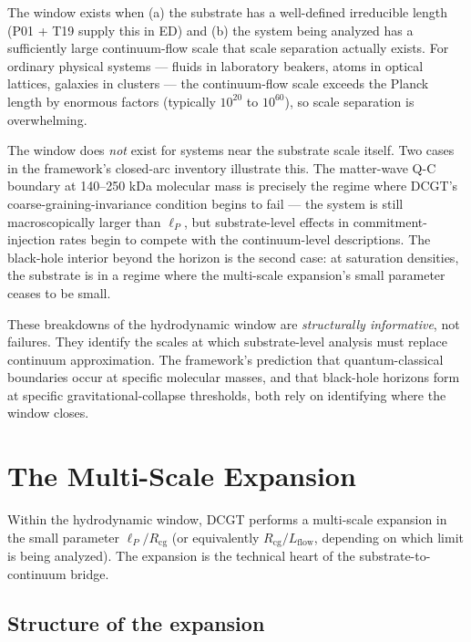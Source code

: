 \documentclass[11pt,a4paper]{article}
\begin{document}
The window exists when (a) the substrate has a well-defined irreducible length (P01 + T19 supply this in ED) and (b) the system being analyzed has a sufficiently large continuum-flow scale that scale separation actually exists. For ordinary physical systems --- fluids in laboratory beakers, atoms in optical lattices, galaxies in clusters --- the continuum-flow scale exceeds the Planck length by enormous factors (typically $10^{20}$ to $10^{60}$), so scale separation is overwhelming.

The window does \emph{not} exist for systems near the substrate scale itself. Two cases in the framework's closed-arc inventory illustrate this. The matter-wave Q-C boundary at 140--250 kDa molecular mass is precisely the regime where DCGT's coarse-graining-invariance condition begins to fail --- the system is still macroscopically larger than $\ell_P$, but substrate-level effects in commitment-injection rates begin to compete with the continuum-level descriptions. The black-hole interior beyond the horizon is the second case: at saturation densities, the substrate is in a regime where the multi-scale expansion's small parameter ceases to be small.

These breakdowns of the hydrodynamic window are \emph{structurally informative}, not failures. They identify the scales at which substrate-level analysis must replace continuum approximation. The framework's prediction that quantum-classical boundaries occur at specific molecular masses, and that black-hole horizons form at specific gravitational-collapse thresholds, both rely on identifying where the window closes.

\section{The Multi-Scale Expansion}

Within the hydrodynamic window, DCGT performs a multi-scale expansion in the small parameter $\ell_P/R_{\mathrm{cg}}$ (or equivalently $R_{\mathrm{cg}}/L_{\mathrm{flow}}$, depending on which limit is being analyzed). The expansion is the technical heart of the substrate-to-continuum bridge.

\subsection{Structure of the expansion}
\end{document}
